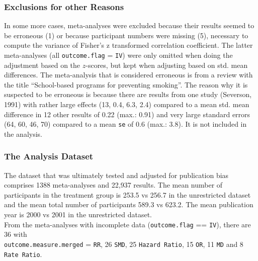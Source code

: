 \documentclass[11pt,a4paper,twoside]{book}\usepackage[]{graphicx}\usepackage[]{color}
\begin{document}
\subsubsection{Exclusions for other Reasons}
In some more cases, meta-analyses were excluded because their results seemed to be erroneous (1) or because participant numbers were missing (5), necessary to compute the variance of Fisher's z transformed correlation coefficient. The latter meta-analyses (all \texttt{outcome.flag} = \texttt{IV}) were only omitted when doing the adjustment based on the $z$-scores, but kept when adjusting based on std. mean differences. The meta-analysis that is considered erroneous is from a review with the title ``School-based programs for preventing smoking''. The reason why it is suspected to be erroneous is because there are results from one study (Severson, 1991) with rather large effects (13, 0.4, 6.3, 2.4) compared to a mean std. mean difference in 12 other results of 0.22 (max.: 0.91) and very large standard errors (64, 60, 46, 70) compared to a mean \texttt{se} of 0.6 (max.: 3.8). It is not included in the analysis. 

\subsubsection{The Analysis Dataset}
The dataset that was ultimately tested and adjusted for publication bias comprises 1388 meta-analyses and 22,937 results. The mean number of participants in the treatment group is 253.5 vs 256.7 in the unrestricted dataset and the mean total number of participants 589.3 vs 623.2. The mean publication year is 2000 vs 2001 in the unrestricted dataset. \\
From the meta-analyses with incomplete data (\texttt{outcome.flag} == \texttt{IV}), there are 36 with \\ \texttt{outcome.measure.merged} = \texttt{RR}, 26 \texttt{SMD},  25 \texttt{Hazard Ratio}, 15 \texttt{OR}, 11 \texttt{MD} and 8 \texttt{Rate Ratio}.
\end{document}
